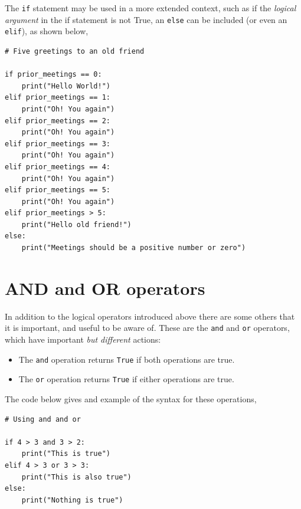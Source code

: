 \documentclass[a4paper]{article}
\begin{document}
The \texttt{if} statement may be used in a more extended context, such as if the \emph{logical argument} in the if statement is not True, an \texttt{else} can be included (or even an \texttt{elif}), as shown below,
\begin{lstlisting}
# Five greetings to an old friend

if prior_meetings == 0:
    print("Hello World!")
elif prior_meetings == 1:
    print("Oh! You again")
elif prior_meetings == 2:
    print("Oh! You again")
elif prior_meetings == 3:
    print("Oh! You again")
elif prior_meetings == 4:
    print("Oh! You again")
elif prior_meetings == 5:
    print("Oh! You again")
elif prior_meetings > 5:
	print("Hello old friend!")
else:
	print("Meetings should be a positive number or zero")
\end{lstlisting}

\section{AND and OR operators}

In addition to the logical operators introduced above there are some others that it is important, and useful to be aware of.
These are the \texttt{and} and \texttt{or} operators, which have important \emph{but different} actions:
\begin{itemize}
	\item{The \texttt{and} operation returns \texttt{True} if both operations are true.}
	\item{The \texttt{or} operation returns \texttt{True} if either operations are true.}
\end{itemize}
The code below gives and example of the syntax for these operations,
\begin{lstlisting}
# Using and and or

if 4 > 3 and 3 > 2:
	print("This is true")
elif 4 > 3 or 3 > 3:
	print("This is also true")
else:
	print("Nothing is true")
\end{lstlisting}
\vspace{\baselineskip}
\begin{center}
	\noindent{}
\end{center}
\end{document}

